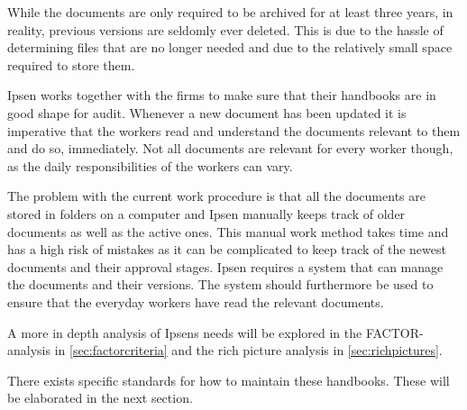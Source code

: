 While the documents are only required to be archived for at least three years, in reality, previous versions are seldomly ever deleted.
This is due to the hassle of determining files that are no longer needed and due to the relatively small space required to store them.

Ipsen works together with the firms to make sure that their handbooks are in good shape for audit.
Whenever a new document has been updated it is imperative that the workers read and understand the documents relevant to them and do so, immediately.
Not all documents are relevant for every worker though, as the daily responsibilities of the workers can vary.

The problem with the current work procedure is that all the documents are stored in folders on a computer and Ipsen manually keeps track of older documents as well as the active ones.
This manual work method takes time and has a high risk of mistakes as it can be complicated to keep track of the newest documents and their approval stages.
Ipsen requires a system that can manage the documents and their versions.
The system should furthermore be used to ensure that the everyday workers have read the relevant documents.

A more in depth analysis of Ipsens needs will be explored in the FACTOR-analysis in \cref{sec:factorcriteria} and the rich picture analysis in \cref{sec:richpictures}.

There exists specific standards for how to maintain these handbooks.
These will be elaborated in the next section.
